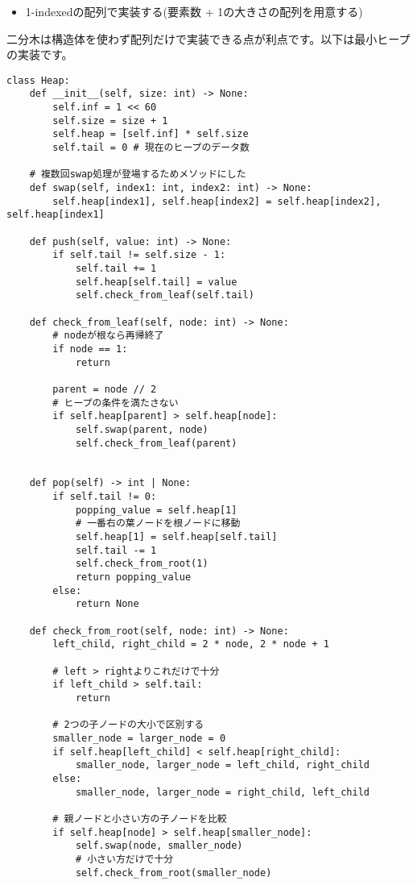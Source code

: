 \begin{itemize}
	\item 1-indexedの配列で実装する(要素数 + 1の大きさの配列を用意する)
\end{itemize}


二分木は構造体を使わず配列だけで実装できる点が利点です。以下は最小ヒープの実装です。

\begin{lstlisting}[caption=二分ヒープの実装, label=binaryheap, frame=TRBL, label={binaryheap}]
class Heap:
	def __init__(self, size: int) -> None:
		self.inf = 1 << 60
		self.size = size + 1
		self.heap = [self.inf] * self.size
		self.tail = 0 # 現在のヒープのデータ数
		
	# 複数回swap処理が登場するためメソッドにした
	def swap(self, index1: int, index2: int) -> None:
		self.heap[index1], self.heap[index2] = self.heap[index2], self.heap[index1]

	def push(self, value: int) -> None:
		if self.tail != self.size - 1:
			self.tail += 1
			self.heap[self.tail] = value
			self.check_from_leaf(self.tail)

	def check_from_leaf(self, node: int) -> None:
		# nodeが根なら再帰終了
		if node == 1:
			return
		
		parent = node // 2
		# ヒープの条件を満たさない
		if self.heap[parent] > self.heap[node]:
			self.swap(parent, node)
			self.check_from_leaf(parent)
		

	def pop(self) -> int | None:
		if self.tail != 0:
			popping_value = self.heap[1]
			# 一番右の葉ノードを根ノードに移動
			self.heap[1] = self.heap[self.tail]
			self.tail -= 1
			self.check_from_root(1)
			return popping_value
		else:
			return None

	def check_from_root(self, node: int) -> None:
		left_child, right_child = 2 * node, 2 * node + 1
		
		# left > rightよりこれだけで十分
		if left_child > self.tail:
			return
		
		# 2つの子ノードの大小で区別する
		smaller_node = larger_node = 0
		if self.heap[left_child] < self.heap[right_child]:
			smaller_node, larger_node = left_child, right_child
		else:
			smaller_node, larger_node = right_child, left_child
		
		# 親ノードと小さい方の子ノードを比較
		if self.heap[node] > self.heap[smaller_node]:
			self.swap(node, smaller_node)
			# 小さい方だけで十分
			self.check_from_root(smaller_node)

\end{lstlisting}

